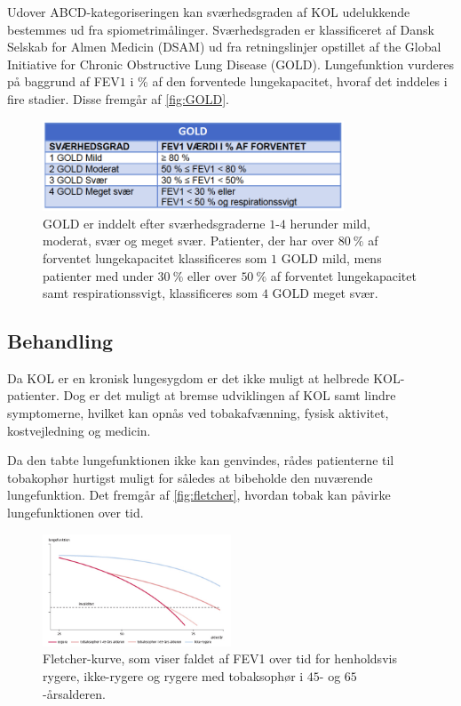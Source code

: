 \noindent
Udover ABCD-kategoriseringen kan sværhedsgraden af KOL udelukkende bestemmes ud fra spiometrimålinger. Sværhedsgraden er klassificeret af Dansk Selskab for Almen Medicin (DSAM) ud fra retningslinjer opstillet af the Global Initiative for Chronic Obstructive Lung Disease (GOLD). Lungefunktion vurderes på baggrund af FEV$1$ i \% af den forventede lungekapacitet, hvoraf det inddeles i fire stadier. Disse fremgår af \autoref{fig:GOLD}.

\begin{figure} [H]
\centering
\includegraphics[width=0.8\textwidth]{figures/GOLD}
\caption{GOLD er inddelt efter sværhedsgraderne $1$-$4$ herunder mild, moderat, svær og meget svær. Patienter, der har over $80~\%$ af forventet lungekapacitet klassificeres som $1$ GOLD mild, mens patienter med under $30~\%$ eller over $50~\%$ af forventet lungekapacitet samt respirationssvigt, klassificeres som $4$ GOLD meget svær.}
\label{fig:GOLD}
\end{figure} 

\subsection{Behandling} \label{sec:behandling}
Da KOL er en kronisk lungesygdom er det ikke muligt at helbrede KOL-patienter. Dog er det muligt at bremse udviklingen af KOL samt lindre symptomerne, hvilket kan opnås ved tobakafvænning, fysisk aktivitet, kostvejledning og medicin. 

Da den tabte lungefunktionen ikke kan genvindes, rådes patienterne til tobakophør hurtigst muligt for således at bibeholde den nuværende lungefunktion. Det fremgår af \autoref{fig:fletcher}, hvordan tobak kan påvirke lungefunktionen over tid. 

\begin{figure} [H]
\centering
\includegraphics[width=0.5\textwidth]{figures/fletcher}
\caption{Fletcher-kurve, som viser faldet af FEV1 over tid for henholdsvis rygere, ikke-rygere og rygere med tobaksophør i $45$- og $65$-årsalderen.}
\label{fig:fletcher}
\end{figure} 

